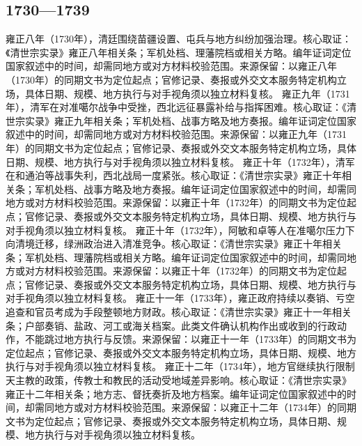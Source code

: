 \subsection{1730—1739}
雍正八年（1730年），清廷围绕苗疆设置、屯兵与地方纠纷加强治理。核心取证：《清世宗实录》雍正八年相关条；军机处档、理藩院档或相关方略。编年证词定位国家叙述中的时间，却需同地方或对方材料校验范围。来源保留：以雍正八年（1730年）的同期文书为定位起点；官修记录、奏报或外交文本服务特定机构立场，具体日期、规模、地方执行与对手视角须以独立材料复核。
雍正九年（1731年），清军在对准噶尔战争中受挫，西北远征暴露补给与指挥困难。核心取证：《清世宗实录》雍正九年相关条；军机处档、战事方略及地方奏报。编年证词定位国家叙述中的时间，却需同地方或对方材料校验范围。来源保留：以雍正九年（1731年）的同期文书为定位起点；官修记录、奏报或外交文本服务特定机构立场，具体日期、规模、地方执行与对手视角须以独立材料复核。
雍正十年（1732年），清军在和通泊等战事失利，西北战局一度紧张。核心取证：《清世宗实录》雍正十年相关条；军机处档、战事方略及地方奏报。编年证词定位国家叙述中的时间，却需同地方或对方材料校验范围。来源保留：以雍正十年（1732年）的同期文书为定位起点；官修记录、奏报或外交文本服务特定机构立场，具体日期、规模、地方执行与对手视角须以独立材料复核。
雍正十年（1732年），阿敏和卓等人在准噶尔压力下向清境迁移，绿洲政治进入清准竞争。核心取证：《清世宗实录》雍正十年相关条；军机处档、理藩院档或相关方略。编年证词定位国家叙述中的时间，却需同地方或对方材料校验范围。来源保留：以雍正十年（1732年）的同期文书为定位起点；官修记录、奏报或外交文本服务特定机构立场，具体日期、规模、地方执行与对手视角须以独立材料复核。
雍正十一年（1733年），雍正政府持续以奏销、亏空追查和官员考成为手段整顿地方财政。核心取证：《清世宗实录》雍正十一年相关条；户部奏销、盐政、河工或海关档案。此类文件确认机构作出或收到的行政动作，不能跳过地方执行与反馈。来源保留：以雍正十一年（1733年）的同期文书为定位起点；官修记录、奏报或外交文本服务特定机构立场，具体日期、规模、地方执行与对手视角须以独立材料复核。
雍正十二年（1734年），地方官继续执行限制天主教的政策，传教士和教民的活动受地域差异影响。核心取证：《清世宗实录》雍正十二年相关条；地方志、督抚奏折及地方档案。编年证词定位国家叙述中的时间，却需同地方或对方材料校验范围。来源保留：以雍正十二年（1734年）的同期文书为定位起点；官修记录、奏报或外交文本服务特定机构立场，具体日期、规模、地方执行与对手视角须以独立材料复核。
